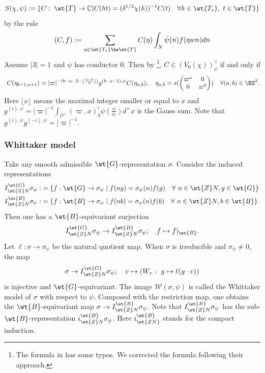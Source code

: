 \documentclass[11pt,reqno]{amsart}
\newcommand{\BC}{{\mathbb {C}}} \newcommand{\BD}{{\mathbb {D}}}
\newcommand{\CO}{{\mathcal {O}}} \newcommand{\CP}{{\mathcal {P}}}
\newcommand{\CW}{{\mathcal {W}}} \newcommand{\CX}{{\mathcal {X}}}
\theoremstyle{plain}
\theoremstyle{remark} \newtheorem{remark}[thm]{Remark}
\theoremstyle{definition} \newtheorem{exercise}[thm]{Exercise}
\theoremstyle{definition} \newtheorem{example}[thm]{Example} \newtheorem{condition}[thm]{Condition}
\numberwithin{equation}{section}
\renewcommand{\-}{\text{--}}
\begin{document}
\[S(\chi,\psi):=\{C:\ \wt{T}\to\BC| C(ht)=(\delta^{1/2}\chi(h))^{-1}C(t)\quad\forall h\in \wt{T_*},\ t\in \wt{T}\}\] by the rule
\[(C, f):=\sum_{\eta\in\wt{T_*}\bs\wt{T}}C(\eta)\int_{N}\bar{\psi}(n)f(\eta w n) dn\]
 Assume $|3|=1$ and $\psi$ has conductor $0$. Then by \cite[Corollary I.3.4]{KP84}\footnote{The formula in  has some typos. We corrected the formula following their approach.}, $C\in (V_0(\chi))_\psi^\vee$ if and only if 
\[\label{cons}\ C(\eta_{b-1,a+1})=|\varpi|^{-(b-a-2-\lfloor{\frac{a-b}{3}}\rfloor)}g^{(b-a-1),\psi}C(\eta_{a,b}),\quad \eta_{a,b}=s(\begin{pmatrix}\varpi^a & 0\\ 0 & \varpi^b\end{pmatrix})\quad\forall (a,b)\in\BZ^2.\]
Here $\lfloor{x}\rfloor$ means the maximal integer smaller or equal to $x$ and  $g^{(i),\psi}=|\varpi|^{-1}\int_{\CO^\times} (\varpi,x)_3^i\psi(\frac{x}{\varpi})d^\times x$ is the Gauss sum.  
Note that $g^{(i),\psi}g^{(-i),\bar{\psi}}=|\varpi|^{-1}.$
\subsubsection{Whittaker model}
Take any smooth admissible $\wt{G}$-representation $\sigma$. Consider the induced representations \begin{align*}
     I_{\wt{Z}N}^{\wt{G}}\sigma_\psi:&=\{f:\wt{G}\to \sigma_\psi\mid f(ng)=\sigma_\psi(n)f(g)\quad \forall\ n\in\wt{Z}N, g\in\wt{G}\}\\
      I_{\wt{Z}N}^{\wt{B}}\sigma_\psi:&=\{f:\wt{B}\to \sigma_\psi\mid f(nb)=\sigma_\psi(n)f(b)\quad \forall\ n\in\wt{Z}N, b\in\wt{B}\}.
 \end{align*}
Then one has a  $\wt{B}$-equivariant  surjection
$$I_{\wt{Z}N}^{\wt{G}}\sigma_\psi\to I_{\wt{Z}N}^{\wt{B}}\sigma_\psi;\quad f\mapsto f|_{\wt{B}}.$$
Let $\ell: \sigma\to\sigma_\psi$ be the natural quotient map. When $\sigma$ is irreducible and $\sigma_\psi\neq0$,  the  map 
 $$ \sigma\to I_{\wt{Z}N}^{\wt{G}}\sigma_\psi;\quad v\mapsto(W_v:\ g\mapsto \ell(g\cdot v))$$
 is injective and $\wt{G}$-equivariant. The image $\CW(\sigma,\psi)$ is called the Whittaker model of $\sigma$ with respect to $\psi$. Composed with the restriction map, one obtains the $\wt{B}$-equivariant map $\sigma\to I_{\wt{Z}N}^{\wt{B}}\sigma_\psi$. Note that $I_{\wt{Z}N}^{\wt{B}}\sigma_\psi$ has the sub-$\wt{B}$-representation $i_{\wt{Z}N}^{\wt{B}}\sigma_\psi$. Here $i_{\wt{ZN}}^{\wt{B}}$ stands for the compact induction.
\end{document}
